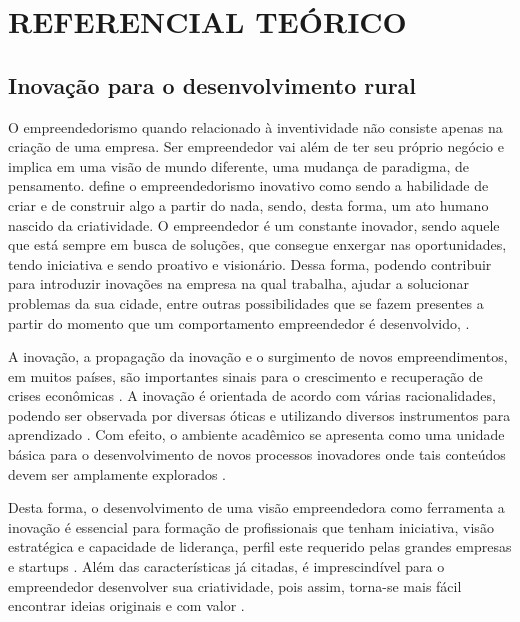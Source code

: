 \chapter{REFERENCIAL TEÓRICO}


\section{Inovação para o desenvolvimento rural}

O empreendedorismo quando relacionado à inventividade não consiste apenas na criação de uma empresa. Ser empreendedor vai além de ter seu próprio negócio e implica em uma visão de mundo diferente, uma mudança de paradigma, de pensamento.   define o empreendedorismo inovativo como sendo a habilidade de criar e de construir algo a partir do nada, sendo, desta forma, um ato humano nascido da criatividade. O empreendedor é um constante inovador, sendo aquele que está sempre em busca de soluções, que consegue enxergar nas oportunidades, tendo iniciativa e sendo proativo e visionário. Dessa forma, podendo contribuir para introduzir inovações na empresa na qual trabalha, ajudar a solucionar problemas da sua cidade, entre outras possibilidades que se fazem presentes a partir do momento que um comportamento empreendedor é desenvolvido, \cite{alencar_intencao_2019, loiola_cao_2016}.

A inovação, a propagação da inovação e o surgimento de novos empreendimentos, em muitos países, são importantes sinais para o crescimento e recuperação de crises econômicas \cite{silva_educacao_2017}. A inovação é orientada de acordo com várias racionalidades, podendo ser observada por diversas óticas e utilizando diversos instrumentos para aprendizado \cite{munoz_innovacion_2016}. Com efeito, o ambiente acadêmico se apresenta como uma unidade básica para o desenvolvimento de novos processos inovadores onde tais conteúdos devem ser amplamente explorados \cite{costa_inovacao_2017}. 

Desta forma, o desenvolvimento de uma visão empreendedora como ferramenta a inovação é essencial para formação de profissionais que tenham iniciativa, visão estratégica e capacidade de liderança, perfil este requerido pelas grandes empresas e startups . Além das características já citadas, é imprescindível para o empreendedor desenvolver sua criatividade, pois assim, torna-se mais fácil encontrar ideias originais e com valor \cite{macedo_capital_2019}. 




